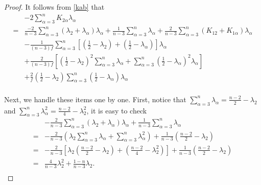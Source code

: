 \documentclass[10pt,a4paper]{amsart}
\begin{document}
\begin{proof}
It follows from \eqref{kab} that
\begin{equation*}
	\begin{aligned}
		&-2\sum_{\alpha=3}^nK_{2\alpha}\lambda_\alpha\\
		 =&\frac{-2}{n-3}\sum_{\alpha=3}^n(\lambda_{2}+\lambda_{\alpha})\lambda_\alpha+\frac{1}{n-3}\sum_{\alpha=3}^n\lambda_\alpha+\frac{2}{n-3}\sum_{\alpha=3}^n(K_{12}+K_{1\alpha })\lambda_\alpha\\
		&-{\frac{1}{(n-3)f}}\sum_{\alpha=3}^n\left[ ({\frac{1}{2}}-\lambda_{2})+({\frac{1}{2}}-\lambda_{\alpha})\right] \lambda_\alpha\\
		&+\frac{2}{(n-3)f}\left[({\frac{1}{2}}-\lambda_{2})^2\sum_{\alpha=3}^n\lambda_{\alpha}+ \sum_{\alpha=3}^n({\frac{1}{2}}-\lambda_{\alpha})^2 \lambda_{\alpha}\right]\\
		&+\frac{2}{f}({\frac{1}{2}}-\lambda_{2})\sum_{\alpha=3}^n({\frac{1}{2}}-\lambda_{\alpha})\lambda_{\alpha}
		\\
	\end{aligned}
\end{equation*}

Next, we handle these items one by one. First, notice that $\sum_{\alpha=3}^n\lambda_\alpha=\frac{n-2}{2}-\lambda_2$ and $\sum_{\alpha=3}^n\lambda_\alpha^2=\frac{n-2}{4}-\lambda_2^2$, it is easy to check
\begin{equation*}
	\begin{aligned}
		&-\frac{2}{n-3}\sum_{\alpha=3}^n(\lambda_{2}+\lambda_{\alpha})\lambda_\alpha+\frac{1}{n-3}\sum_{\alpha=3}^n\lambda_\alpha\\		 =&-\frac{2}{n-3}(\lambda_{2}\sum_{\alpha=3}^n\lambda_\alpha+\sum_{\alpha=3}^n\lambda_\alpha^2)+\frac{1}{n-3}(\frac{n-2}{2}-\lambda_{2})\\
		 =&-\frac{2}{n-3}\left[\lambda_2\left(\frac{n-2}{2}-\lambda_2\right)+\left(\frac{n-2}{4}-\lambda_2^2\right)\right]+\frac{1}{n-3}\left(\frac{n-2}{2}-\lambda_2\right)\\
		=&\frac{4}{n-3}\lambda_2^2+\frac{1-n}{n-3}\lambda_2.\\
	\end{aligned}
\end{equation*}


\end{proof}
\end{document}
